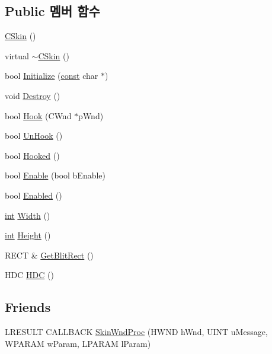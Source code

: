 \subsection*{Public 멤버 함수}
\begin{DoxyCompactItemize}
\item 
\mbox{\hyperlink{class_c_skin_a2126d21d5cb401180163298c61533b87}{C\+Skin}} ()
\item 
virtual \mbox{\hyperlink{class_c_skin_a206a4d1b135da1869bdf786aba217c2b}{$\sim$\+C\+Skin}} ()
\item 
bool \mbox{\hyperlink{class_c_skin_ac9b8048b8c4a853574cc4c0f8b29827d}{Initialize}} (\mbox{\hyperlink{getopt1_8c_a2c212835823e3c54a8ab6d95c652660e}{const}} char $\ast$)
\item 
void \mbox{\hyperlink{class_c_skin_a13edf7704211f61440871e17eda1d216}{Destroy}} ()
\item 
bool \mbox{\hyperlink{class_c_skin_a4897349a9944fe2e2ee9cfdc4f0baf47}{Hook}} (C\+Wnd $\ast$p\+Wnd)
\item 
bool \mbox{\hyperlink{class_c_skin_ab8237ed204df8eb4632ef3bc921783a3}{Un\+Hook}} ()
\item 
bool \mbox{\hyperlink{class_c_skin_a99b438d858bbafa83569f19e707ba3c9}{Hooked}} ()
\item 
bool \mbox{\hyperlink{class_c_skin_ad6adaa12dbedc193c907d4a1b2c2445b}{Enable}} (bool b\+Enable)
\item 
bool \mbox{\hyperlink{class_c_skin_adb8775c6c421ab3551b51e803bcf20d3}{Enabled}} ()
\item 
\mbox{\hyperlink{_util_8cpp_a0ef32aa8672df19503a49fab2d0c8071}{int}} \mbox{\hyperlink{class_c_skin_ae819e05e0e07c194d24bc8cdf5daeb94}{Width}} ()
\item 
\mbox{\hyperlink{_util_8cpp_a0ef32aa8672df19503a49fab2d0c8071}{int}} \mbox{\hyperlink{class_c_skin_a26de0d121ce1811feea27cc30f4c2f70}{Height}} ()
\item 
R\+E\+CT \& \mbox{\hyperlink{class_c_skin_a8fe20ca67965deec6e5e29a2bf467933}{Get\+Blit\+Rect}} ()
\item 
H\+DC \mbox{\hyperlink{class_c_skin_a4112f4df38d9917d38c5db2622777c1f}{H\+DC}} ()
\end{DoxyCompactItemize}
\subsection*{Friends}
\begin{DoxyCompactItemize}
\item 
L\+R\+E\+S\+U\+LT C\+A\+L\+L\+B\+A\+CK \mbox{\hyperlink{class_c_skin_ac58ecd226acd172d4941912f99e2cb12}{Skin\+Wnd\+Proc}} (H\+W\+ND h\+Wnd, U\+I\+NT u\+Message, W\+P\+A\+R\+AM w\+Param, L\+P\+A\+R\+AM l\+Param)
\end{DoxyCompactItemize}


